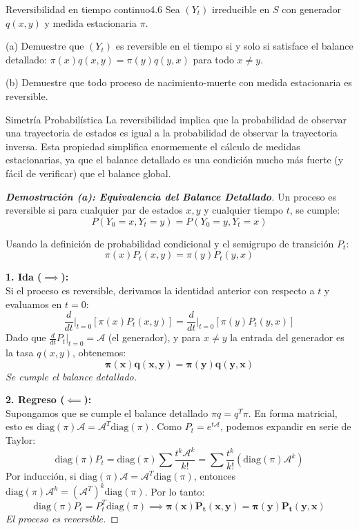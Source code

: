 \documentclass[10pt,a4paper]{article}
\begin{document}
\begin{ejercicio}{Reversibilidad en tiempo continuo}{4.6}
    Sea $(Y_t)$ irreducible en $S$ con generador $q(x,y)$ y medida estacionaria $\pi$.
    
    (a) Demuestre que $(Y_t)$ es reversible en el tiempo si y solo si satisface el balance detallado: $\pi(x)q(x,y) = \pi(y)q(y,x)$ para todo $x \neq y$.
    
    (b) Demuestre que todo proceso de nacimiento-muerte con medida estacionaria es reversible.
\end{ejercicio}

\vspace{2mm}

\begin{nota}{Simetría Probabilística}
    La reversibilidad implica que la probabilidad de observar una trayectoria de estados es igual a la probabilidad de observar la trayectoria inversa. Esta propiedad simplifica enormemente el cálculo de medidas estacionarias, ya que el balance detallado es una condición mucho más fuerte (y fácil de verificar) que el balance global.
\end{nota}

\vspace{5mm}

\begin{proof}[\textbf{Demostración (a): Equivalencia del Balance Detallado}]
    Un proceso es reversible si para cualquier par de estados $x, y$ y cualquier tiempo $t$, se cumple:
    \[ P(Y_0 = x, Y_t = y) = P(Y_0 = y, Y_t = x) \]
    
    Usando la definición de probabilidad condicional y el semigrupo de transición $P_t$:
    \[ \pi(x) P_t(x, y) = \pi(y) P_t(y, x) \]
    
    \textbf{1. Ida ($\implies$):} \\
    Si el proceso es reversible, derivamos la identidad anterior con respecto a $t$ y evaluamos en $t=0$:
    \[ \frac{d}{dt} \Big|_{t=0} [\pi(x) P_t(x, y)] = \frac{d}{dt} \Big|_{t=0} [\pi(y) P_t(y, x)] \]
    Dado que $\frac{d}{dt} P_t \big|_{t=0} = \mathcal{A}$ (el generador), y para $x \neq y$ la entrada del generador es la tasa $q(x, y)$, obtenemos:
    \[ \mathbf{\pi(x) q(x, y) = \pi(y) q(y, x)} \]
    \textit{Se cumple el balance detallado.}

    \vspace{3mm}
    \textbf{2. Regreso ($\impliedby$):} \\
    Supongamos que se cumple el balance detallado $\pi q = q^T \pi$. En forma matricial, esto es $\text{diag}(\pi) \mathcal{A} = \mathcal{A}^T \text{diag}(\pi)$. 
    Como $P_t = e^{t\mathcal{A}}$, podemos expandir en serie de Taylor:
    \[ \text{diag}(\pi) P_t = \text{diag}(\pi) \sum \frac{t^k \mathcal{A}^k}{k!} = \sum \frac{t^k}{k!} (\text{diag}(\pi) \mathcal{A}^k) \]
    Por inducción, si $\text{diag}(\pi) \mathcal{A} = \mathcal{A}^T \text{diag}(\pi)$, entonces $\text{diag}(\pi) \mathcal{A}^k = (\mathcal{A}^T)^k \text{diag}(\pi)$.
    Por lo tanto:
    \[ \text{diag}(\pi) P_t = P_t^T \text{diag}(\pi) \implies \mathbf{\pi(x) P_t(x, y) = \pi(y) P_t(y, x)} \]
    \textit{El proceso es reversible.}
\end{proof}
\end{document}
